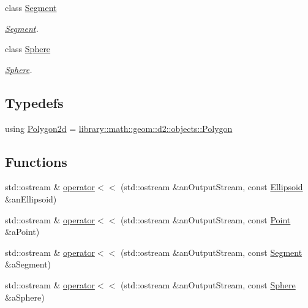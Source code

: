 \begin{DoxyCompactItemize}
class \hyperlink{classlibrary_1_1math_1_1geom_1_1d3_1_1objects_1_1_segment}{Segment}
\begin{DoxyCompactList}\small\item\em \hyperlink{classlibrary_1_1math_1_1geom_1_1d3_1_1objects_1_1_segment}{Segment}. \end{DoxyCompactList}\item 
class \hyperlink{classlibrary_1_1math_1_1geom_1_1d3_1_1objects_1_1_sphere}{Sphere}
\begin{DoxyCompactList}\small\item\em \hyperlink{classlibrary_1_1math_1_1geom_1_1d3_1_1objects_1_1_sphere}{Sphere}. \end{DoxyCompactList}\end{DoxyCompactItemize}
\subsection*{Typedefs}
\begin{DoxyCompactItemize}
\item 
using \hyperlink{namespacelibrary_1_1math_1_1geom_1_1d3_1_1objects_ae339035ccf9a6f4f0d2945fdcfd76f95}{Polygon2d} = \hyperlink{classlibrary_1_1math_1_1geom_1_1d2_1_1objects_1_1_polygon}{library\+::math\+::geom\+::d2\+::objects\+::\+Polygon}
\end{DoxyCompactItemize}
\subsection*{Functions}
\begin{DoxyCompactItemize}
\item 
std\+::ostream \& \hyperlink{namespacelibrary_1_1math_1_1geom_1_1d3_1_1objects_afec709c8a129bead70ffe69d72138f20}{operator$<$$<$} (std\+::ostream \&an\+Output\+Stream, const \hyperlink{classlibrary_1_1math_1_1geom_1_1d3_1_1objects_1_1_ellipsoid}{Ellipsoid} \&an\+Ellipsoid)
\item 
std\+::ostream \& \hyperlink{namespacelibrary_1_1math_1_1geom_1_1d3_1_1objects_aff4b6d4638922231d2c1c3cf6bbba8d2}{operator$<$$<$} (std\+::ostream \&an\+Output\+Stream, const \hyperlink{classlibrary_1_1math_1_1geom_1_1d3_1_1objects_1_1_point}{Point} \&a\+Point)
\item 
std\+::ostream \& \hyperlink{namespacelibrary_1_1math_1_1geom_1_1d3_1_1objects_a6ebfe5087caa91d080eb4b84a625ae87}{operator$<$$<$} (std\+::ostream \&an\+Output\+Stream, const \hyperlink{classlibrary_1_1math_1_1geom_1_1d3_1_1objects_1_1_segment}{Segment} \&a\+Segment)
\item 
std\+::ostream \& \hyperlink{namespacelibrary_1_1math_1_1geom_1_1d3_1_1objects_a486555b5a738479bbc34beae21546945}{operator$<$$<$} (std\+::ostream \&an\+Output\+Stream, const \hyperlink{classlibrary_1_1math_1_1geom_1_1d3_1_1objects_1_1_sphere}{Sphere} \&a\+Sphere)
\end{DoxyCompactItemize}



